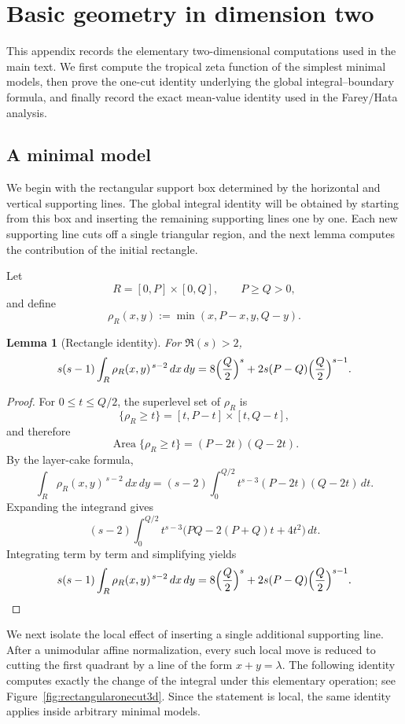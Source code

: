 \documentclass[a4paper,american,11pt]{amsart}
\theoremstyle{plain}
\newtheorem{lemma}[theorem]{Lemma}
\theoremstyle{definition}
\DeclareMathOperator{\Area}{Area}
\begin{document}
\appendix

\section{Basic geometry in dimension two}\label{app1}

This appendix records the elementary two-dimensional computations used in the
main text. We first compute the tropical zeta function of the simplest
minimal models, then prove the one-cut identity underlying the global
integral--boundary formula, and finally record the exact mean-value identity
used in the Farey/Hata analysis.

\subsection{A minimal model}

We begin with the rectangular support box determined by the horizontal and
vertical supporting lines. The global integral identity will be obtained by
starting from this box and inserting the remaining supporting lines one by
one. Each new supporting line cuts off a single triangular region, and the
next lemma computes the contribution of the initial rectangle.

Let
\[
R=[0,P]\times[0,Q],
\qquad P\ge Q>0,
\]
and define
\[
\rho_R(x,y):=\min(x,P-x,y,Q-y).
\]

\begin{lemma}[Rectangle identity]\label{lem:rectangle}
For \(\Re(s)>2\),
\[
s(s-1)\int_R \rho_R(x,y)^{\,s-2}\,dx\,dy
=
8\Bigl(\frac Q2\Bigr)^s
+
2s(P-Q)\Bigl(\frac Q2\Bigr)^{s-1}.
\]
\end{lemma}

\begin{proof}
For \(0\le t\le Q/2\), the superlevel set of \(\rho_R\) is
\[
\{\rho_R\ge t\}=[t,P-t]\times[t,Q-t],
\]
and therefore
\[
\Area\{\rho_R\ge t\}=(P-2t)(Q-2t).
\]
By the layer-cake formula,
\[
\int_R \rho_R(x,y)^{\,s-2}\,dx\,dy
=
(s-2)\int_0^{Q/2}t^{s-3}(P-2t)(Q-2t)\,dt.
\]
Expanding the integrand gives
\[
(s-2)\int_0^{Q/2}
t^{s-3}\bigl(PQ-2(P+Q)t+4t^2\bigr)\,dt.
\]
Integrating term by term and simplifying yields
\[
s(s-1)\int_R \rho_R(x,y)^{\,s-2}\,dx\,dy
=
8\Bigl(\frac Q2\Bigr)^s
+
2s(P-Q)\Bigl(\frac Q2\Bigr)^{s-1}.
\]
\end{proof}

We next isolate the local effect of inserting a single additional supporting
line. After a unimodular affine normalization, every such local move is
reduced to cutting the first quadrant by a line of the form \(x+y=\lambda\).
The following identity computes exactly the change of the integral under this
elementary operation; see Figure~\ref{fig:rectangularonecut3d}. Since the
statement is local, the same identity applies inside arbitrary minimal models.
\end{document}
